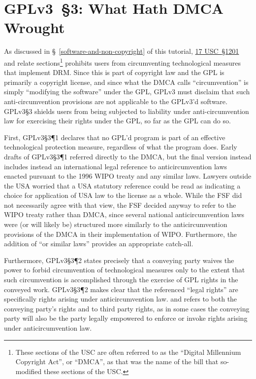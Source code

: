 \section{GPLv3~\S3: What Hath DMCA Wrought}
\label{GPLv3s3}

As discussed in \S~\ref{software-and-non-copyright} of this tutorial,
\href{http://www.law.cornell.edu/uscode/text/17/1201}{17 USC~\S1201} and
relate sections\footnote{These sections of the USC are often referred to as
  the ``Digital Millennium Copyright Act'', or ``DMCA'', as that was the name
  of the bill that so-modified these sections of the USC\@.} prohibits users
from circumventing technological measures that implement DRM\@.  Since this
is part of copyright law and the GPL is primarily a copyright license, and
since what the DMCA calls ``circumvention'' is simply ``modifying the
software'' under the GPL, GPLv3 must disclaim that such anti-circumvention
provisions are not applicable to the GPLv3'd software.  GPLv3\S3 shields
users from being subjected to liability under anti-circumvention law for
exercising their rights under the GPL, so far as the GPL can do so.

First, GPLv3\S3\P1 declares that no GPL'd program is part of an effective
technological protection measure, regardless of what the program does.  Early
drafts of GPLv3\S3\P1 referred directly to the DMCA, but the final version
instead includes instead an international legal reference to
anticircumvention laws enacted pursuant to the 1996 WIPO treaty and any
similar laws.  Lawyers outside the USA worried that a USA statutory reference
could be read as indicating a choice for application of USA law to the
license as a whole.  While the FSF did not necessarily agree with that view,
the FSF decided anyway to refer to the WIPO treaty rather than DMCA, since
several national anticircumvention laws were (or will likely be) structured
more similarly to the anticircumvention provisions of the DMCA in their
implementation of WIPO\@.  Furthermore, the addition of ``or similar laws''
provides an appropriate catch-all.

Furthermore, GPLv3\S3\P2 states precisely that a conveying party waives the
power to forbid circumvention of technological measures only to the extent
that such circumvention is accomplished through the exercise of GPL rights in
the conveyed work.  GPLv3\S3\P2 makes clear that the referenced ``legal
rights'' are specifically rights arising under anticircumvention law.  and
refers to both the conveying party's rights and to third party rights, as in
some cases the conveying party will also be the party legally empowered to
enforce or invoke rights arising under anticircumvention law.

